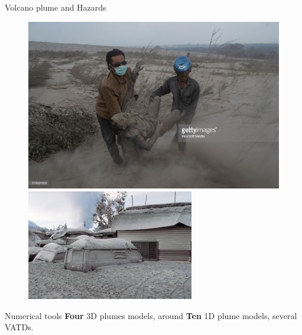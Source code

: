 \documentclass{beamer}
\begin{document}
\begin{frame}{Volcano plume and Hazards}
\begin{figure}[!t]
\begin{minipage}{.32\textwidth}
\end{minipage}
\begin{minipage}{.32\textwidth}
\center
\includegraphics[width=.95\textwidth]{./PPT/Ash_community4}
\end{minipage}
\begin{minipage}{.32\textwidth}
\center
\includegraphics[width=.95\textwidth]{./PPT/Ash_community3}
\end{minipage}
\end{figure}

\begin{block} {Numerical tools}
\textbf{Four} 3D plumes models, around \textbf{Ten} 1D plume models, several VATDs.
\end{block}
\end{frame}
\end{document}
